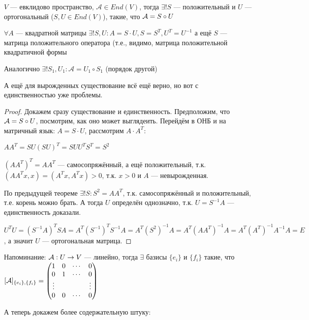 
\begin{theorem}
    $V$ --- евклидово пространство, $\mathcal{A} \in End(V)$, тогда $\exists! S$ --- положительный и $U$ --- ортогональный ($S, U \in End(V)$), такие, что $\mathcal{A} = S \circ U$
\end{theorem}
\begin{theorem}
    $\forall A$ --- квадратной матрицы $\exists! S, U: A = S \cdot U, S = S^T, U^T = U^{-1}$ а ещё $S$ --- матрица положительного оператора (т.е., видимо, матрица положительной квадратичной формы
\end{theorem}
\begin{remark}
    Аналогично $\exists! S_1, U_1 : \mathcal{A} = U_1 \circ S_1$ (порядок другой)

    А ещё для вырожденных существование всё ещё верно, но вот с единственностью уже проблемы.
\end{remark}

\begin{proof}
    Докажем сразу существование и единственность. Предположим, что $\mathcal{A} = S \circ U$, посмотрим, как оно может выглядеить. Перейдём в ОНБ и на матричный язык: $A = S \cdot U$, рассмотрим $A \cdot A^T$:

    $A A^T = SU(SU)^T = SUU^TS^T = S^2$

    $(AA^T)^T = AA^T$ --- самосопряжённый, а ещё положительный, т.к. $(AA^Tx, x) = (A^Tx, A^Tx) > 0$, т.к. $x > 0$ и $A$ --- невырожденная.

    По предыдущей теореме $\exists ! S : S^2 = AA^T$, т.к. самосопряжённый и положительный, т.е. корень можно брать. А тогда $U$ определён однозначно, т.к. $U = S^{-1}A$ --- единственность доказали.

    $U^T U = (S^{-1}A)^T SA = A^T (S^{-1}) ^T S^{-1}A = A^T (S^2)^{-1}A = A^T (AA^T)^{-1}A = A^T(A^T)^{-1}A^{-1}A = E$, а значит $U$ --- ортогональная матрица.
\end{proof}

Напоминание: $\mathcal{A} : U \to V$ --- линейно, тогда $\exists$ базисы $\{e_i\}$ и $\{ f_i \}$ такие, что $[\mathcal{A}]_{\{e_i\}, \{f_i\}} = \begin{pmatrix} 1 & 0 & \cdots & 0 \\ 0 & 1 & \cdots & 0 \\ \vdots & & & \vdots \\ 0 & 0 & \cdots & 0  \end{pmatrix}$

А теперь докажем более содержательную штуку:


